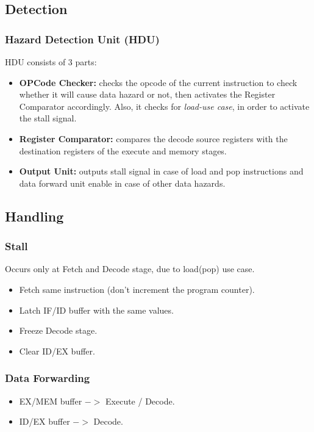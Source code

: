\documentclass[12pt]{report}
\begin{document}
\subsection{Detection}
\subsubsection{Hazard Detection Unit (HDU)}
HDU consists of 3 parts:
\begin{itemize}
    \item \textbf{OPCode Checker:} checks the opcode of the current instruction to check whether it will cause data hazard or not, then activates the Register Comparator accordingly. Also, it checks for \emph{load-use case}, in order to activate the stall signal.
    \item \textbf{Register Comparator:} compares the decode source registers with the destination registers of the execute and memory stages.
    \item \textbf{Output Unit:} outputs stall signal in case of load and pop instructions and data forward unit enable in case of other data hazards.
\end{itemize}

\subsection{Handling}

\subsubsection{Stall}
Occurs only at Fetch and Decode stage, due to load(pop) use case.
\begin{itemize}
    \item Fetch same instruction (don't increment the program counter).
    \item Latch IF/ID buffer with the same values.
    \item Freeze Decode stage.
    \item Clear ID/EX buffer.
\end{itemize}

\subsubsection{Data Forwarding}
\begin{itemize}
    \item EX/MEM buffer $->$ Execute / Decode.
    \item ID/EX buffer $->$ Decode.
\end{itemize}
\end{document}
